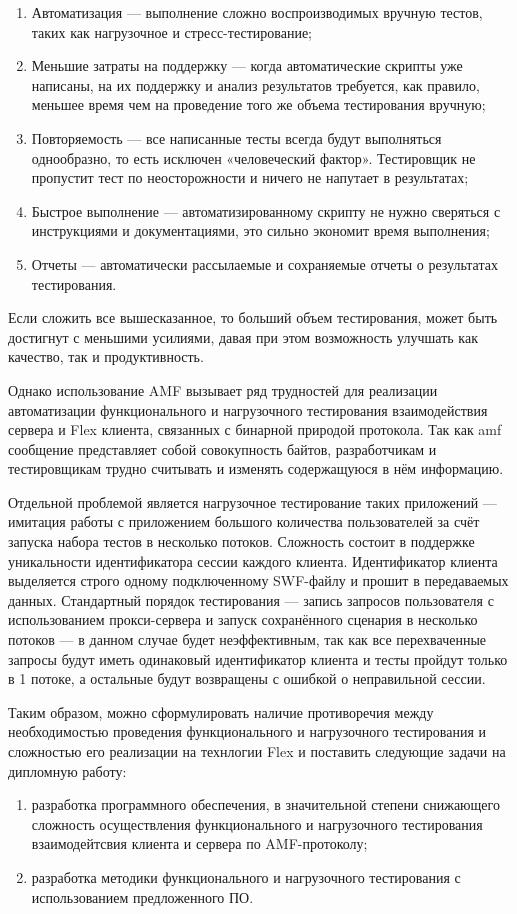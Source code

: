 \begin{enumerate}
\item Автоматизация --- выполнение сложно воспроизводимых вручную тестов, таких как нагрузочное
и стресс-тестирование;
\item Меньшие затраты на поддержку --- когда автоматические скрипты уже написаны, на их поддержку
и анализ результатов требуется, как правило, меньшее время чем на проведение того же объема тестирования вручную;
\item Повторяемость --- все написанные тесты всегда будут выполняться однообразно, то есть
исключен «человеческий фактор». Тестировщик не пропустит тест по неосторожности и ничего не
напутает в результатах;
\item Быстрое выполнение --- автоматизированному скрипту не нужно сверяться с инструкциями и
документациями, это сильно экономит время выполнения;
\item Отчеты --- автоматически рассылаемые и сохраняемые отчеты о результатах тестирования.
\end{enumerate}

Если сложить все вышесказанное, то больший объем тестирования, может быть
достигнут с меньшими усилиями, давая при этом возможность улучшать как качество, 
так и продуктивность\cite{testing}.

Однако использование AMF вызывает ряд трудностей для реализации автоматизации функционального 
и нагрузочного тестирования взаимодействия сервера и Flex клиента, связанных с бинарной 
природой протокола. Так как amf сообщение представляет собой совокупность байтов, 
разработчикам и тестировщикам трудно считывать и изменять содержащуюся в нём информацию.

Отдельной проблемой является нагрузочное тестирование таких приложений --- имитация работы с
приложением большого количества пользователей за счёт запуска набора тестов в несколько потоков. 
Сложность состоит в поддержке уникальности идентификатора сессии каждого клиента. Идентификатор 
клиента выделяется строго одному подключенному SWF-файлу и прошит в передаваемых данных.
Стандартный порядок тестирования --- запись запросов пользователя с использованием прокси-сервера
и запуск сохранённого сценария в несколько потоков --- в данном случае будет неэффективным, так
как все перехваченные запросы будут иметь одинаковый идентификатор клиента и тесты пройдут
только в 1 потоке, а остальные будут возвращены с ошибкой о неправильной сессии.
 
Таким образом, можно сформулировать наличие противоречия между необходимостью проведения функционального
и нагрузочного тестирования и сложностью его реализации на технлогии Flex и поставить следующие задачи на 
дипломную работу:

\begin{enumerate}
\item разработка программного обеспечения, в значительной степени снижающего сложность осуществления функционального
и нагрузочного тестирования взаимодейтсвия клиента и сервера по AMF-протоколу;
\item разработка методики функционального и нагрузочного тестирования с использованием предложенного ПО.
\end{enumerate}